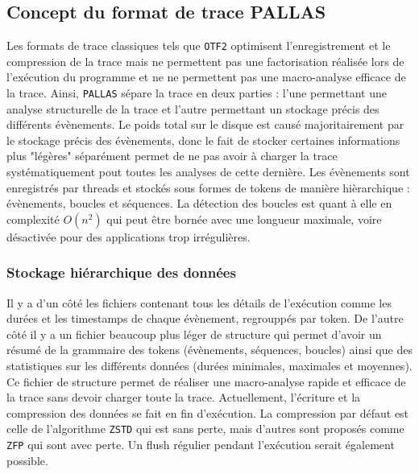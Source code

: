

\subsection{Concept du format de trace PALLAS}\label{ssec:pallas_status}

Les formats de trace classiques tels que \verb!OTF2! optimisent l'enregistrement et le compression de la trace mais ne permettent pas une factorisation réalisée lors de l'exécution du programme 
et ne ne permettent pas une macro-analyse efficace de la trace.\newline
Ainsi, \verb!PALLAS! sépare la trace en deux parties : l'une permettant une analyse structurelle de la trace et l'autre permettant un stockage précis des différents évènements.
Le poids total sur le disque est causé majoritairement par le stockage précis des évènements, donc le fait de stocker certaines informations plus "légères" séparément permet de ne pas 
avoir à charger la trace systématiquement pout toutes les analyses de cette dernière.\newline
Les évènements sont enregistrés par threads et stockés sous formes de tokens de manière hièrarchique : évènements, boucles et séquences.\newline
La détection des boucles est quant à elle en complexité $O(n^2)$ qui peut être bornée avec une longueur maximale, voire désactivée pour des applications trop irrégulières.

\subsubsection{Stockage hiérarchique des données}\label{ssec:hierarchy}

Il y a d'un côté les fichiers contenant tous les détails de l'exécution comme les durées et les timestamps de chaque évènement, regrouppés par token. \newline
De l'autre côté il y a un fichier beaucoup plus léger de structure qui permet d'avoir un résumé de la grammaire des tokens (évènements, séquences, boucles) ainsi que des statistiques
sur les différents données (durées minimales, maximales et moyennes). Ce fichier de structure permet de réaliser une macro-analyse rapide et efficace de la trace sans devoir charger toute la trace.\newline
Actuellement, l'écriture et la compression des données se fait en fin d'exécution. La compression par défaut est celle de l'algorithme \verb!ZSTD! qui est sans perte, mais d'autres sont 
proposés comme \verb!ZFP! qui sont avec perte. Un flush régulier pendant l'exécution serait également possible.

